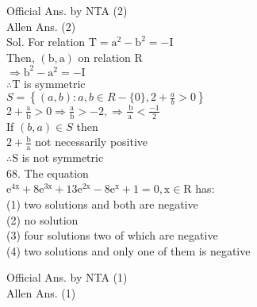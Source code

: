 \documentclass[10pt]{article}
\begin{document}
Official Ans. by NTA (2)\\
Allen Ans. (2)\\
Sol. For relation \(\mathrm{T}=\mathrm{a}^{2}-\mathrm{b}^{2}=-\mathrm{I}\)\\
Then, \((\mathrm{b}, \mathrm{a})\) on relation R\\
\(\Rightarrow \mathrm{b}^{2}-\mathrm{a}^{2}=-\mathrm{I}\)\\
\(\therefore \mathrm{T}\) is symmetric\\
\(S=\left\{(a, b): a, b \in R-\{0\}, 2+\frac{a}{b}>0\right\}\)\\
\(2+\frac{\mathrm{a}}{\mathrm{b}}>0 \Rightarrow \frac{\mathrm{a}}{\mathrm{b}}>-2, \Rightarrow \frac{\mathrm{~b}}{\mathrm{a}}<\frac{-1}{2}\)\\
If \((b, a) \in S\) then\\
\(2+\frac{\mathrm{b}}{\mathrm{a}}\) not necessarily positive\\
\(\therefore \mathrm{S}\) is not symmetric\\
68. The equation\\
\(\mathrm{e}^{4 \mathrm{x}}+8 \mathrm{e}^{3 \mathrm{x}}+13 \mathrm{e}^{2 \mathrm{x}}-8 \mathrm{e}^{\mathrm{x}}+1=0, \mathrm{x} \in \mathrm{R}\) has:\\
(1) two solutions and both are negative\\
(2) no solution\\
(3) four solutions two of which are negative\\
(4) two solutions and only one of them is negative

Official Ans. by NTA (1)\\
Allen Ans. (1)
\end{document}
